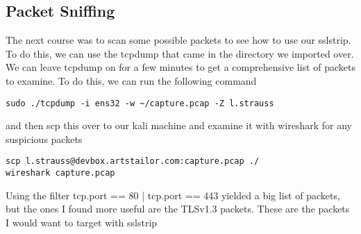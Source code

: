 \documentclass[notitlepage]{article}
\begin{document}
    \subsection{Packet Sniffing}
    The next course was to scan some possible packets to see how to use our sslstrip. To do this, we can use the tcpdump that came in the directory we imported over. We can
    leave tcpdump on for a few minutes to get a comprehensive list of packets to examine. To do this, we can run the following command
\begin{verbatim}
sudo ./tcpdump -i ens32 -w ~/capture.pcap -Z l.strauss
\end{verbatim}
    and then scp this over to our kali machine and examine it with wireshark for any suspicious packets
\begin{verbatim}
scp l.strauss@devbox.artstailor.com:capture.pcap ./
wireshark capture.pcap
\end{verbatim}
    Using the filter tcp.port == 80 | tcp.port == 443 yielded a big list of packets, but the ones I found more useful are the TLSv1.3 packets. These are the packets I would want to target with sslstrip
\end{document}
